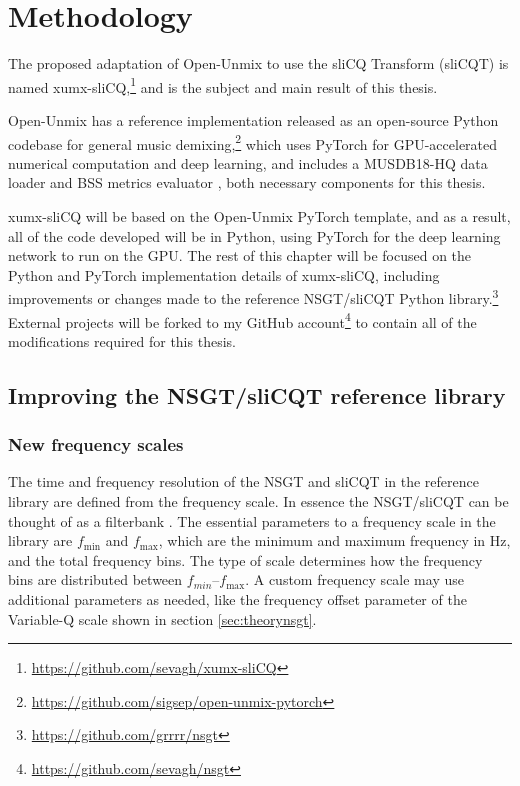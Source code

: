 \documentclass[report.tex]{subfiles}
\begin{document}
\section{Methodology}
\label{sec:methodology}

The proposed adaptation of Open-Unmix \parencite{umx} to use the sliCQ Transform (sliCQT) \parencite{invertiblecqt, slicq} is named xumx-sliCQ,\footnote{\url{https://github.com/sevagh/xumx-sliCQ}} and is the subject and main result of this thesis.

Open-Unmix \parencite{umx} has a reference implementation released as an open-source Python codebase for general music demixing,\footnote{\url{https://github.com/sigsep/open-unmix-pytorch}} which uses PyTorch \parencite{pytorch} for GPU-accelerated numerical computation and deep learning, and includes a MUSDB18-HQ data loader \parencite{musdb18hq} and BSS metrics evaluator \parencite{bss}, both necessary components for this thesis.

xumx-sliCQ will be based on the Open-Unmix PyTorch template, and as a result, all of the code developed will be in Python, using PyTorch for the deep learning network to run on the GPU. The rest of this chapter will be focused on the Python and PyTorch implementation details of xumx-sliCQ, including improvements or changes made to the reference NSGT/sliCQT Python library.\footnote{\url{https://github.com/grrrr/nsgt}} External projects will be forked to my GitHub account\footnote{\url{https://github.com/sevagh/nsgt}} to contain all of the modifications required for this thesis.

\subsection{Improving the NSGT/sliCQT reference library}
\label{sec:improvelib}

\subsubsection{New frequency scales}
\label{sec:freqscales}

The time and frequency resolution of the NSGT and sliCQT in the reference library are defined from the frequency scale. In essence the NSGT/sliCQT can be thought of as a filterbank \parencite{variableq1}. The essential parameters to a frequency scale in the library are $f_{\text{min}}$ and $f_{\text{max}}$, which are the minimum and maximum frequency in Hz, and the total frequency bins. The type of scale determines how the frequency bins are distributed between $f_{min}$--$f_{\text{max}}$. A custom frequency scale may use additional parameters as needed, like the frequency offset parameter of the Variable-Q scale shown in section \ref{sec:theorynsgt}.
\end{document}
